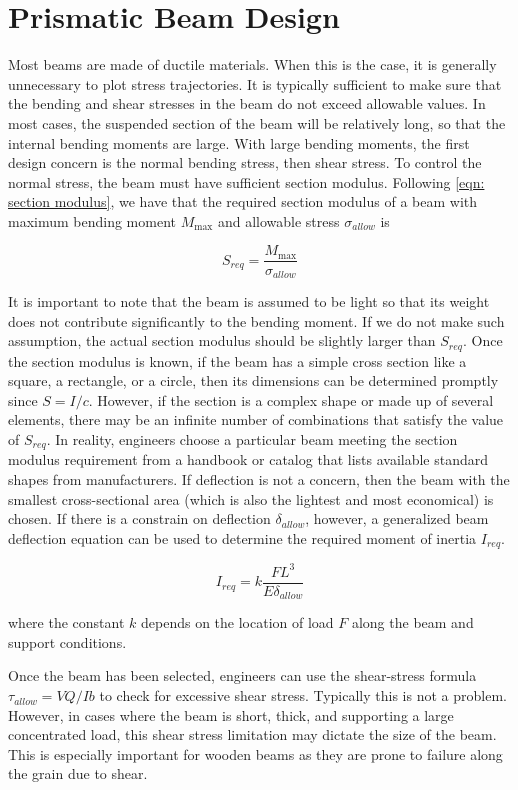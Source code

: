 \documentclass[a4paper,openany,12pt]{book}
\begin{document}
{{\section{Prismatic Beam Design}
\label{prismatic-beam-design}
Most beams are made of ductile materials. When this is the case, it is
generally unnecessary to plot stress trajectories. It is typically
sufficient to make sure that the bending and shear stresses in the beam
do not exceed allowable values. In most cases, the suspended section of
the beam will be relatively long, so that the internal bending moments
are large. With large bending moments, the first design concern is the
normal bending stress, then shear stress. To control the normal stress,
the beam must have sufficient section modulus. Following
\ref{eqn: section modulus}, we have that the
required section modulus of a beam with maximum bending moment
\(M_{\max}\) and allowable stress \(\sigma_{allow}\) is

$$S_{req} = \frac{M_{\max}}{\sigma_{allow}}$$

It is important to note that the beam is assumed to be light so that its
weight does not contribute significantly to the bending moment. If we do
not make such assumption, the actual section modulus should be slightly
larger than \(S_{req}\). Once the section modulus is known, if the beam
has a simple cross section like a square, a rectangle, or a circle, then
its dimensions can be determined promptly since \(S = I/c\). However, if
the section is a complex shape or made up of several elements, there may
be an infinite number of combinations that satisfy the value of
\(S_{req}\). In reality, engineers choose a particular beam meeting the
section modulus requirement from a handbook or catalog that lists
available standard shapes from manufacturers. If deflection is not a
concern, then the beam with the smallest cross-sectional area (which is
also the lightest and most economical) is chosen. If there is a
constrain on deflection \(\delta_{allow}\), however, a generalized beam
deflection equation can be used to determine the required moment of
inertia \(I_{req}\).

$$I_{req} = k \frac{FL^3}{E \delta_{allow}}$$

where the constant \(k\) depends on the location of load \(F\) along the
beam and support conditions.

Once the beam has been selected, engineers can use the shear-stress
formula \(\tau_{allow} = VQ/Ib\) to check for excessive shear stress.
Typically this is not a problem. However, in cases where the beam is
short, thick, and supporting a large concentrated load, this shear
stress limitation may dictate the size of the beam. This is especially
important for wooden beams as they are prone to failure along the grain
due to shear.

}}
\end{document}
